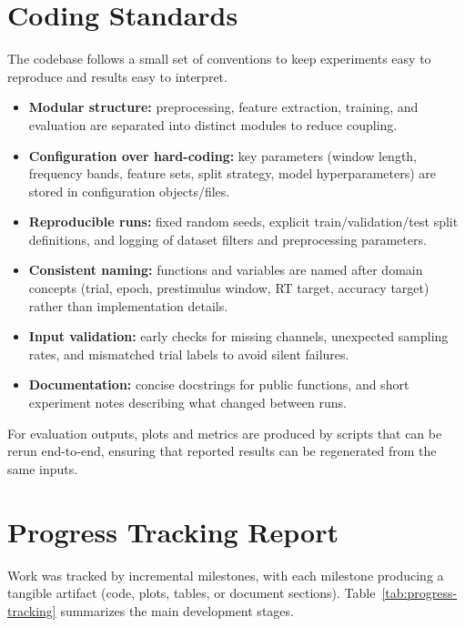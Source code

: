 \section{Coding Standards}
\label{sec:coding-standards}
The codebase follows a small set of conventions to keep experiments easy to reproduce and results easy to interpret.

\begin{itemize}[leftmargin=*]
	\item \textbf{Modular structure:} preprocessing, feature extraction, training, and evaluation are separated into distinct modules to reduce coupling.
	\item \textbf{Configuration over hard-coding:} key parameters (window length, frequency bands, feature sets, split strategy, model hyperparameters) are stored in configuration objects/files.
	\item \textbf{Reproducible runs:} fixed random seeds, explicit train/validation/test split definitions, and logging of dataset filters and preprocessing parameters.
	\item \textbf{Consistent naming:} functions and variables are named after domain concepts (trial, epoch, prestimulus window, RT target, accuracy target) rather than implementation details.
	\item \textbf{Input validation:} early checks for missing channels, unexpected sampling rates, and mismatched trial labels to avoid silent failures.
	\item \textbf{Documentation:} concise docstrings for public functions, and short experiment notes describing what changed between runs.
\end{itemize}

For evaluation outputs, plots and metrics are produced by scripts that can be rerun end-to-end, ensuring that reported results can be regenerated from the same inputs.

\section{Progress Tracking Report}
\label{sec:progress-tracking-report}
Work was tracked by incremental milestones, with each milestone producing a tangible artifact (code, plots, tables, or document sections).
Table~\ref{tab:progress-tracking} summarizes the main development stages.

